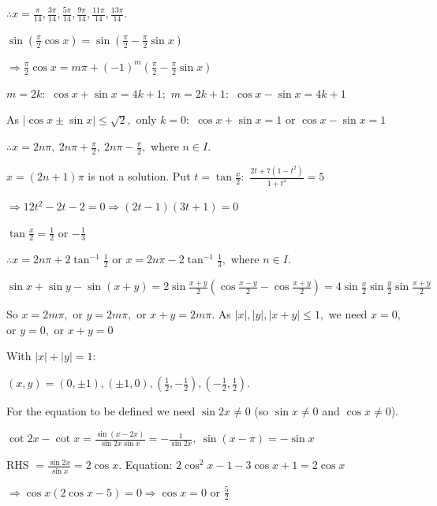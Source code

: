   $\therefore x = \frac{\pi}{14}, \frac{3\pi}{14}, \frac{5\pi}{14}, \frac{9\pi}{14}, \frac{11\pi}{14}, \frac{13\pi}{14}.$

\item $\sin\left(\frac{\pi}{2}\cos x\right) = \sin\left(\frac{\pi}{2} - \frac{\pi}{2}\sin x\right)$

  $\Rightarrow \frac{\pi}{2}\cos x = m\pi + (-1)^m\left(\frac{\pi}{2} - \frac{\pi}{2}\sin x\right)$

  $m = 2k:$ $\cos x + \sin x = 4k + 1;$ $m = 2k + 1:$ $\cos x - \sin x = 4k + 1$

  As $|\cos x\pm\sin x|\leq\sqrt{2},$ only $k = 0:$ $\cos x + \sin x = 1$ or $\cos x - \sin x = 1$

  $\therefore x = 2n\pi,~2n\pi + \frac{\pi}{2},~2n\pi - \frac{\pi}{2},$ where $n\in I.$

\item $x = (2n + 1)\pi$ is not a solution. Put $t = \tan\frac{x}{2}:$ $\frac{2t + 7(1 - t^2)}{1 + t^2} = 5$

  $\Rightarrow 12t^2 - 2t - 2 = 0 \Rightarrow (2t - 1)(3t + 1) = 0$

  $\tan\frac{x}{2} = \frac{1}{2}$ or $-\frac{1}{3}$

  $\therefore x = 2n\pi + 2\tan^{-1}\frac{1}{2}$ or $x = 2n\pi - 2\tan^{-1}\frac{1}{3},$ where $n\in I.$

\item $\sin x + \sin y - \sin(x + y) = 2\sin\frac{x + y}{2}\left(\cos\frac{x - y}{2} - \cos\frac{x + y}{2}\right) =
  4\sin\frac{x}{2}\sin\frac{y}{2}\sin\frac{x + y}{2}$

  So $x = 2m\pi,$ or $y = 2m\pi,$ or $x + y = 2m\pi.$ As $|x|, |y|, |x + y|\leq 1,$ we need $x = 0,$ or $y = 0,$ or $x + y = 0$

  With $|x| + |y| = 1:$

  $(x, y) = (0, \pm 1), (\pm 1, 0), \left(\frac{1}{2}, -\frac{1}{2}\right), \left(-\frac{1}{2}, \frac{1}{2}\right).$

\item For the equation to be defined we need $\sin2x\neq 0$ (so $\sin x\neq 0$ and $\cos x\neq 0$).

  $\cot2x - \cot x = \frac{\sin(x - 2x)}{\sin2x\sin x} = -\frac{1}{\sin2x},~\sin(x - \pi) = -\sin x$

  RHS $= \frac{\sin2x}{\sin x} = 2\cos x.$ Equation: $2\cos^2x - 1 - 3\cos x + 1 = 2\cos x$

  $\Rightarrow \cos x(2\cos x - 5) = 0 \Rightarrow \cos x = 0$ or $\frac{5}{2}$

